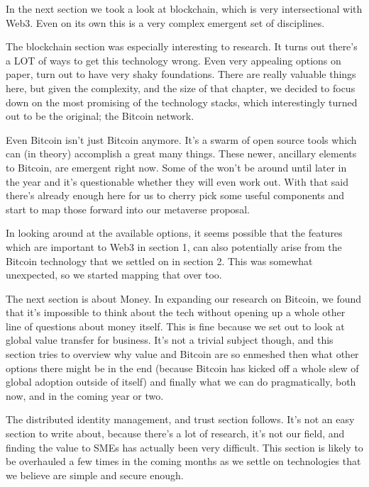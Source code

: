 In the next section we took a look at blockchain, which is very intersectional with Web3. Even on its own this is a very complex emergent set of disciplines. \par
The blockchain section was especially interesting to research. It turns out there’s a LOT of ways to get this technology wrong. Even very appealing options on paper, turn out to have very shaky foundations. There are really valuable things here, but given the complexity, and the size of that chapter, we decided to focus down on the most promising of the technology stacks, which interestingly turned out to be the original; the Bitcoin network.\par
Even Bitcoin isn’t just Bitcoin anymore. It’s a swarm of open source tools which can (in theory) accomplish a great many things. These newer, ancillary elements to Bitcoin, are emergent right now. Some of the won’t be around until later in the year and it’s questionable whether they will even work out. With that said there’s already enough here for us to cherry pick some useful components and start to map those forward into our metaverse proposal.\par
In looking around at the available options, it seems possible that the features which are important to Web3 in section 1, can also potentially arise from the Bitcoin technology that we settled on in section 2. This was somewhat unexpected, so we started mapping that over too.\par
The next section is about Money. In expanding our research on Bitcoin, we found that it’s impossible to think about the tech without opening up a whole other line of questions about money itself. This is fine because we set out to look at global value transfer for business. It’s not a trivial subject though, and this section tries to overview why value and Bitcoin are so enmeshed then what other options there might be in the end (because Bitcoin has kicked off a whole slew of global adoption outside of itself) and finally what we can do pragmatically, both now, and in the coming year or two.\par
The distributed identity management, and trust section follows. It’s not an easy section to write about, because there’s a lot of research, it’s not our field, and finding the value to SMEs has actually been very difficult. This section is likely to be overhauled a few times in the coming months as we settle on technologies that we believe are simple and secure enough.\par
